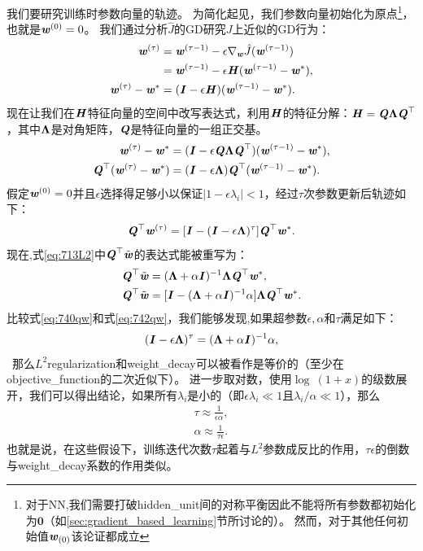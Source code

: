 我们要研究训练时参数向量的轨迹。
为简化起见，我们参数向量初始化为原点\footnote{对于\gls{NN},我们需要打破\gls{hidden_unit}间的对称平衡因此不能将所有参数都初始化为$\mathbf{0}$（如\ref{sec:gradient_based_learning}节所讨论的）。
然而，对于其他任何初始值$\Vw_{(0)}$该论证都成立}，也就是$\Vw^{(0)} = 0$。
我们通过分析$\hat{J}$的\gls{GD}研究$J$上近似的\gls{GD}行为：
\begin{align}
\Vw^{(\tau)} &= \Vw^{(\tau-1)} -\epsilon \nabla_{\Vw} \hat{J}( \Vw^{(\tau-1)} ) \\
&=  \Vw^{(\tau-1)}  - \epsilon  \MH ( \Vw^{(\tau-1)} -  \Vw^* ), \\
\Vw^{(\tau)}  -  \Vw^* &= (\MI - \epsilon  \MH) ( \Vw^{(\tau-1)} -  \Vw^* ).
 \end{align}
现在让我们在$\MH$特征向量的空间中改写表达式，利用$\MH$的特征分解：$\MH = \MQ \VLambda \MQ^\top$，其中$\VLambda$是对角矩阵，$\MQ$是特征向量的一组正交基。
\begin{align}
\Vw^{(\tau)}  -  \Vw^* &= (\MI - \epsilon \MQ \VLambda \MQ^\top) ( \Vw^{(\tau-1)} -  \Vw^* ), \\
\MQ^\top (\Vw^{(\tau)}  -  \Vw^*) &= (\MI - \epsilon \VLambda)\MQ^\top ( \Vw^{(\tau-1)} -  \Vw^* ).
\end{align}
假定$\Vw^{(0)} = 0$并且$\epsilon$选择得足够小以保证$|1 - \epsilon \lambda_i |<1$，经过$\tau$次参数更新后轨迹如下：
\begin{align} \label{eq:740qw}
\MQ^\top  \Vw^{(\tau)} = [\MI - (\MI - \epsilon \VLambda)^\tau] \MQ^\top  \Vw^* .
\end{align}
现在,式\ref{eq:713L2}中$\MQ^\top \tilde \Vw$的表达式能被重写为：
\begin{align}
\MQ^\top  \tilde \Vw &= (\VLambda + \alpha \MI)^{-1} \VLambda \MQ^\top  \Vw^*, \\
\MQ^\top  \tilde \Vw &= [\MI - (\VLambda + \alpha \MI)^{-1} \alpha] \VLambda \MQ^\top  \Vw^*. 
\label{eq:742qw}
\end{align}
比较式\ref{eq:740qw}和式\ref{eq:742qw}，我们能够发现,如果超参数$\epsilon, \alpha$和$\tau$满足如下：
\begin{align}
(\MI - \epsilon \VLambda)^\tau =  (\VLambda + \alpha \MI)^{-1} \alpha,
\end{align}\
那么$L^2$\gls{regularization}和\gls{weight_decay}可以被看作是等价的（至少在\gls{objective_function}的二次近似下）。
进一步取对数，使用$\log~(1+x)$的级数展开，我们可以得出结论，如果所有$\lambda_i$是小的（即$\epsilon \lambda_i \ll 1$且$\lambda_i / \alpha \ll 1$），那么
\begin{align}
\tau \approx \frac{1}{\epsilon \alpha}, \\
\alpha \approx \frac{1}{\tau \epsilon}.
\end{align}
也就是说，在这些假设下，训练迭代次数$\tau$起着与$L^2$参数成反比的作用，$\tau \epsilon$的倒数与\gls{weight_decay}系数的作用类似。

